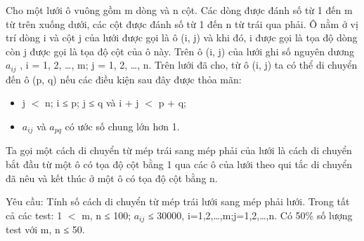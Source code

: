 Cho một lưới ô vuông gồm m dòng và n cột. Các dòng được đánh số từ 1 đến m từ trên xuống dưới, các cột được đánh số từ 1 đến n từ trái qua phải. Ô nằm ở vị trí dòng i và cột j của lưới được gọi là ô   (i, j) và khi đó, i được gọi là tọa độ dòng còn j được gọi là tọa độ cột của ô này. Trên ô (i, j) của lưới ghi số nguyên dương $a_{ij}$   , i = 1, 2, …, m; j = 1, 2, …, n. Trên lưới đã cho, từ ô (i, j) ta có thể   di chuyển đến ô (p, q) nếu các điều kiện sau đây được thỏa mãn:  
\begin{itemize}
	\item     j $<$ n; i ≤ p; j ≤ q và i + j $<$ p + q;   
	\item     $a_{ij}$    và $a_{pq}$    có ước số chung lớn hơn 1.   
\end{itemize}

   Ta gọi một cách di chuyển từ mép trái sang mép phải của lưới là cách di chuyển bắt đầu từ một ô có tọa độ cột bằng 1 qua các ô của lưới theo qui tắc di chuyển đã nêu và kết thúc ở một ô có tọa độ cột   bằng n.  

   Yêu cầu: Tính số cách di chuyển từ mép trái lưới sang mép phải lưới.
Trong tất cả các test: 1 $<$ m, n ≤ 100; $a_{ij}$   ≤ 30000, i=1,2,…,m;j=1,2,…,n. Có 50\% số lượng test với m, n ≤ 50.